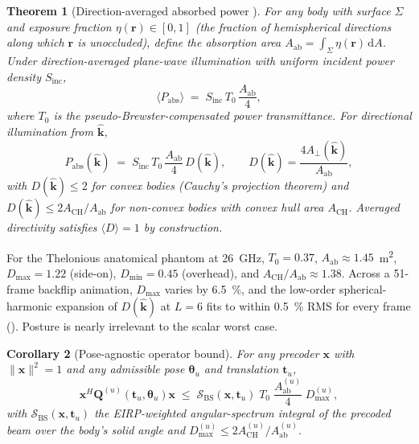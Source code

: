 \documentclass[journal,twoside,onecolumn]{IEEEtran}
\newtheorem{theorem}{Theorem}
\newtheorem{corollary}[theorem]{Corollary}
\theoremstyle{definition}
\newcommand{\khat}{\hat{\bm{k}}}
\newcommand{\rr}{\mathbf{r}}
\newcommand{\xx}{\mathbf{x}}
\newcommand{\Sinc}{S_{\mathrm{inc}}}
\newcommand{\Pabs}{P_{\mathrm{abs}}}
\newcommand{\Q}{\mathbf{Q}}
\newcommand{\Aperp}{A_{\perp}}
\newcommand{\Aab}{A_{\mathrm{ab}}}
\begin{document}
\begin{theorem}[Direction-averaged absorbed power \cite{WydaegheMonograph,Cauchy1841}]
\label{thm:cauchy}
For any body with surface $\Sigma$ and exposure fraction
$\eta(\rr)\in[0,1]$ (the fraction of hemispherical directions
along which $\rr$ is unoccluded), define the absorption area
$\Aab=\int_\Sigma\eta(\rr)\,\mathrm{d}A$. Under direction-averaged
plane-wave illumination with uniform incident power density
$\Sinc$,
\begin{equation}\label{eq:gen-cauchy}
  \langle \Pabs\rangle\;=\;\Sinc\,T_0\,\frac{\Aab}{4},
\end{equation}
where $T_0$ is the pseudo-Brewster-compensated power transmittance.
For directional illumination from $\khat$,
\begin{equation}\label{eq:Pabs-D}
  \Pabs(\khat)\;=\;\Sinc\,T_0\,\frac{\Aab}{4}\,D(\khat),
  \qquad D(\khat)=\frac{4\Aperp(\khat)}{\Aab},
\end{equation}
with $D(\khat)\le 2$ for convex bodies (Cauchy's projection
theorem) and $D(\khat)\le 2A_{\mathrm{CH}}/\Aab$ for non-convex
bodies with convex hull area $A_{\mathrm{CH}}$. Averaged
directivity satisfies $\langle D\rangle=1$ by construction.
\end{theorem}

For the Thelonious anatomical phantom at 26~GHz, $T_0=0.37$,
$\Aab\approx 1.45$~m\textsuperscript{2}, $D_{\max}=1.22$
(side-on), $D_{\min}=0.45$ (overhead), and
$A_{\mathrm{CH}}/\Aab\approx 1.38$. Across a 51-frame backflip
animation, $D_{\max}$ varies by \SI{6.5}{\percent}, and the
low-order spherical-harmonic expansion of $D(\khat)$ at $L=6$ fits
to within \SI{0.5}{\percent} RMS for every frame
(\cite[§5.6]{WydaegheMonograph}). Posture is nearly irrelevant to
the scalar worst case.

\begin{corollary}[Pose-agnostic operator bound]\label{cor:cauchy-bound}
For any precoder $\xx$ with $\|\xx\|^2=1$ and any admissible pose
$\bm\theta_u$ and translation $\mathbf{t}_u$,
\begin{equation}\label{eq:cauchy-wc}
  \xx^H\Q^{(u)}(\mathbf{t}_u,\bm\theta_u)\xx
  \;\le\;\mathcal{S}_{\mathrm{BS}}(\xx,\mathbf{t}_u)\;T_0\;
         \frac{\Aab^{(u)}}{4}\;D_{\max}^{(u)},
\end{equation}
with $\mathcal{S}_{\mathrm{BS}}(\xx,\mathbf{t}_u)$ the EIRP-weighted
angular-spectrum integral of the precoded beam over the body's
solid angle and $D_{\max}^{(u)}\le 2A_{\mathrm{CH}}^{(u)}/\Aab^{(u)}$.
\end{corollary}
\end{document}
